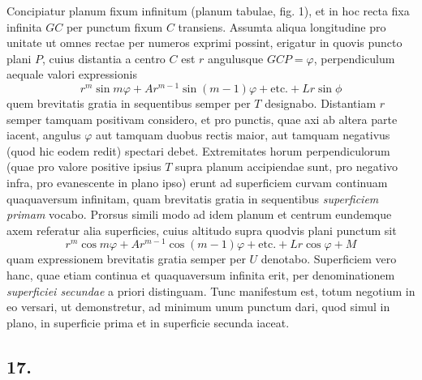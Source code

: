 \documentclass[twoside,12pt, showframe]{memoir}
\begin{document}
Concipiatur planum fixum infinitum (planum tabulae, fig. 1), et in hoc recta fixa infinita \(GC\) per punctum fixum \(C\) transiens. Assumta aliqua longitudine pro unitate ut omnes rectae per numeros exprimi possint, erigatur in quovis puncto plani \(P\), cuius distantia a centro \(C\) est \(r\) angulusque \(GCP = \varphi\), perpendiculum aequale valori expressionis \[ r^m \sin m \varphi + A r^{m-1} \sin(m-1)\varphi + \text{etc{.}} + L r\sin \phi \] quem brevitatis gratia in sequentibus semper per \(T\) designabo. Distantiam \(r\) semper tamquam positivam considero, et pro punctis, quae axi ab altera parte iacent, angulus \(\varphi\) aut tamquam duobus rectis maior, aut tamquam negativus (quod hic eodem redit) spectari debet. Extremitates horum perpendiculorum (quae pro valore positive ipsius \(T\) supra planum accipiendae sunt, pro negativo infra, pro evanescente in plano ipso) erunt ad superficiem curvam continuam quaquaversum infinitam, quam brevitatis gratia in sequentibus \textit{superficiem primam} vocabo. Prorsus simili modo ad idem planum et centrum eundemque axem referatur alia superficies, cuius altitudo supra quodvis plani punctum sit \[r^m\cos m\varphi + Ar^{m-1}\cos(m-1)\varphi + \text{etc{.}}+Lr\cos\varphi+M\] quam expressionem brevitatis gratia semper per \(U\) denotabo. Superficiem vero hanc, quae etiam continua et quaquaversum infinita erit, per denominationem \textit{superficiei secundae} a priori distinguam. Tunc manifestum est, totum negotium in eo versari, ut demonstretur, ad minimum unum punctum dari, quod simul in plano, in superficie prima et in superficie secunda iaceat.

\subsection*{17.} 
\end{document}
